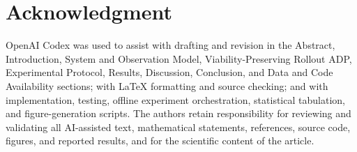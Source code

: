 \documentclass{IEEEtaes}
\theoremstyle{remark}
\theoremstyle{plain}
\begin{document}


\section*{Acknowledgment}
OpenAI Codex was used to assist with drafting and revision in the Abstract, Introduction, System and Observation Model, Viability-Preserving Rollout ADP, Experimental Protocol, Results, Discussion, Conclusion, and Data and Code Availability sections; with LaTeX formatting and source checking; and with implementation, testing, offline experiment orchestration, statistical tabulation, and figure-generation scripts. The authors retain responsibility for reviewing and validating all AI-assisted text, mathematical statements, references, source code, figures, and reported results, and for the scientific content of the article.






\end{document}
